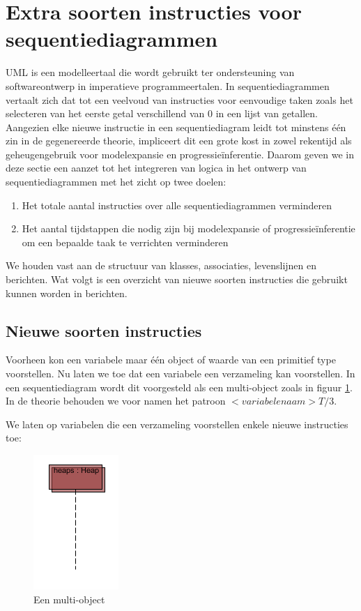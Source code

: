 \section{Extra soorten instructies voor sequentiediagrammen}\label{sec:newlang}
UML is een modelleertaal die wordt gebruikt ter ondersteuning van softwareontwerp in imperatieve programmeertalen. In sequentiediagrammen vertaalt zich dat tot een veelvoud van instructies voor eenvoudige taken zoals het selecteren van het eerste getal verschillend van 0 in een lijst van getallen. Aangezien elke nieuwe instructie in een sequentiediagram leidt tot minstens \'e\'en zin in de gegenereerde theorie, impliceert dit een grote kost in zowel rekentijd als geheugengebruik voor modelexpansie en progressie\"inferentie. Daarom geven we in deze sectie een aanzet tot het integreren van logica in het ontwerp van sequentiediagrammen met het zicht op twee doelen:

\begin{enumerate}
	\item Het totale aantal instructies over alle sequentiediagrammen verminderen
	\item Het aantal tijdstappen die nodig zijn bij modelexpansie of progressie\"inferentie om een bepaalde taak te verrichten verminderen
\end{enumerate}

We houden vast aan de structuur van klasses, associaties, levenslijnen en berichten. Wat volgt is een overzicht van nieuwe soorten instructies die gebruikt kunnen worden in berichten.

\subsection{Nieuwe soorten instructies}

Voorheen kon een variabele maar \'e\'en object of waarde van een primitief type voorstellen. Nu laten we toe dat een variabele een verzameling kan voorstellen. In een sequentiediagram wordt dit voorgesteld als een multi-object zoals in figuur \ref{fig:multi-object}. In de theorie behouden we voor namen het patroon $<variabelenaam>T/3$.

We laten op variabelen die een verzameling voorstellen enkele nieuwe instructies toe:

\begin{figure}
	\includegraphics{chap-gedrag/seq-multi-object.png}
	\centering
	\caption{Een multi-object}
	\label{fig:multi-object}
\end{figure}

